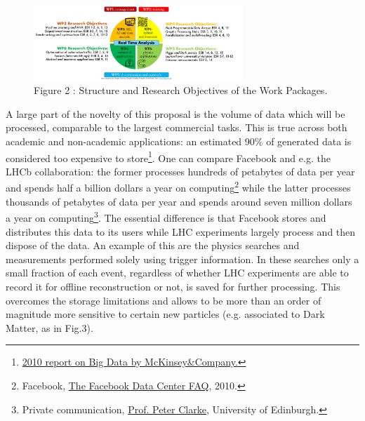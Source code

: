   \begin{figure}
	\includegraphics[width=0.7\textwidth]{figs/WPs} %
	\caption*{Figure 2 : Structure and Research Objectives of the Work Packages.\label{fig:WPs}}
\end{figure}
A large part of the novelty of this proposal is the volume of data which will
be processed, comparable to the largest commercial tasks. 
This is true across both academic and non-academic applications:
an estimated 90$\%$ of generated data is considered too expensive to store\footnote{\href{http://www.mckinsey.com/insights/business_technology/big_data_the_next_frontier_for_innovation}{2010 report on Big Data by McKinsey\&Company.}}.
One can compare Facebook and e.g. the LHCb collaboration:
the former processes hundreds of petabytes of data per year and spends half a billion
dollars a year on computing\footnote{Facebook, 
  \href{http://www.datacenterknowledge.com/the-facebook-data-center-faq-page-three/}{The Facebook Data Center FAQ}, 2010.}
while the latter processes thousands of petabytes of data per year
and spends around seven million dollars a year on computing\footnote{Private communication, \href{mailto:peter.clarke@ed.ac.uk}{Prof. Peter Clarke}, University of Edinburgh.}. The essential difference is that Facebook
stores and distributes this data to its users while LHC experiments 
largely process and then dispose of the data. An example of this are the physics searches and measurements performed
solely using trigger information. In these searches only a small fraction of each event, regardless of whether
LHC experiments are able to record it for offline reconstruction or not, is saved for further processing. 
This overcomes the storage limitations and allows to be more than an order of magnitude more sensitive
to certain new particles (e.g. associated to Dark Matter, as in Fig.3).

